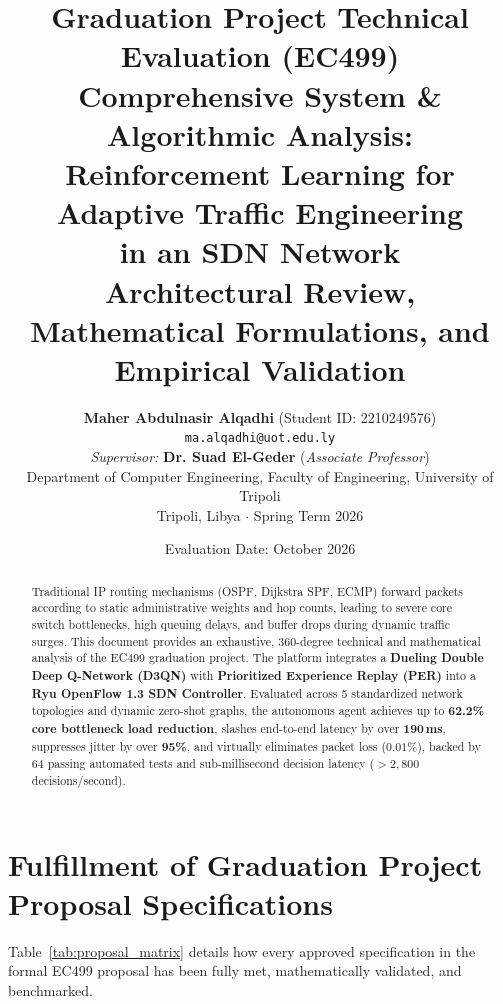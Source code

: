 \documentclass[11pt,a4paper]{article}
\title{
    \vspace{-1.0cm}
    {\large\color{secondary}\textbf{Graduation Project Technical Evaluation (EC499)}}\\[0.3cm]
    {\LARGE\color{primary}\textbf{Comprehensive System \& Algorithmic Analysis:\\Reinforcement Learning for Adaptive Traffic Engineering\\in an SDN Network}}\\[0.3cm]
    {\large\textbf{Architectural Review, Mathematical Formulations, and Empirical Validation}}\vspace{-0.2cm}
}
\author{
    \textbf{Maher Abdulnasir Alqadhi} \quad (Student ID: 2210249576)\\
    \texttt{ma.alqadhi@uot.edu.ly}\\[0.15cm]
    \emph{Supervisor:} \textbf{Dr. Suad El-Geder} \quad (\emph{Associate Professor})\\[0.15cm]
    Department of Computer Engineering, Faculty of Engineering, University of Tripoli\\
    Tripoli, Libya $\cdot$ Spring Term 2026
}
\date{\small Evaluation Date: October 2026}
\begin{document}
\maketitle

\begin{abstract}
\noindent
Traditional IP routing mechanisms (OSPF, Dijkstra SPF, ECMP) forward packets according to static administrative weights and hop counts, leading to severe core switch bottlenecks, high queuing delays, and buffer drops during dynamic traffic surges. This document provides an exhaustive, 360-degree technical and mathematical analysis of the EC499 graduation project. The platform integrates a \textbf{Dueling Double Deep Q-Network (D3QN)} with \textbf{Prioritized Experience Replay (PER)} into a \textbf{Ryu OpenFlow 1.3 SDN Controller}. Evaluated across 5 standardized network topologies and dynamic zero-shot graphs, the autonomous agent achieves up to \textbf{62.2\% core bottleneck load reduction}, slashes end-to-end latency by over \textbf{190\,ms}, suppresses jitter by over \textbf{95\%}, and virtually eliminates packet loss ($0.01\%$), backed by 64 passing automated tests and sub-millisecond decision latency ($>2,800$ decisions/second).
\end{abstract}

\section{Fulfillment of Graduation Project Proposal Specifications}

Table~\ref{tab:proposal_matrix} details how every approved specification in the formal EC499 proposal has been fully met, mathematically validated, and benchmarked.
\end{document}
